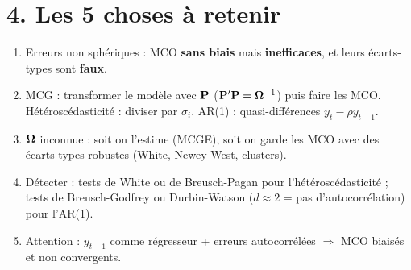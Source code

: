 \documentclass[12pt,a4paper]{article}
\begin{document}
\section*{4. Les 5 choses à retenir}
\begin{enumerate}[itemsep=4pt]
\item Erreurs non sphériques : MCO \textbf{sans biais} mais \textbf{inefficaces}, et leurs écarts-types sont \textbf{faux}.
\item MCG : transformer le modèle avec $\mathbf{P}$ ($\mathbf{P}'\mathbf{P}=\bm{\Omega}^{-1}$) puis faire les MCO. Hétéroscédasticité : diviser par $\sigma_i$. AR(1) : quasi-différences $y_t-\rho y_{t-1}$.
\item $\bm{\Omega}$ inconnue : soit on l'estime (MCGE), soit on garde les MCO avec des écarts-types robustes (White, Newey-West, clusters).
\item Détecter : tests de White ou de Breusch-Pagan pour l'hétéroscédasticité ; tests de Breusch-Godfrey ou Durbin-Watson ($d\approx2$ = pas d'autocorrélation) pour l'AR(1).
\item Attention : $y_{t-1}$ comme régresseur + erreurs autocorrélées $\Rightarrow$ MCO biaisés et non convergents.
\end{enumerate}
\end{document}
